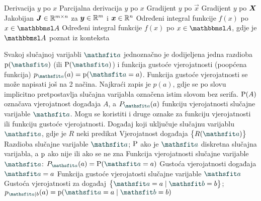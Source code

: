 				{Derivacija $y$ po $x$}
 				{Parcijalna derivacija $y$ po $x$}
 	{Gradijent $y$ po $\vec x$}
	{Gradijent $y$ po $\mat X$}
 	{Jakobijan $\mat J\in \R^{m\times n}$ za $\vec y\in\R^m$ i $\vec x\in\R^n$}
 {Određeni integral funkcije $f(x)$ po $x\in\set A$}
 {Određeni integral funkcije $f(x)$ po $x\in\set A$, gdje je $\set A$ poznat iz konteksta}

{Svakoj slučajnoj varijabli $\rvar a$ jednoznačno je dodijeljena jedna razdioba $\p(\rvar a)$ (ili $\P(\rvar a)$) i funkcija gustoće vjerojatnosti (poopćena funkcija) $p_{\rvar a}(a)=\p(\rvar a=a)$. Funkcija gustoće vjerojatnosti se može napisati još na 2 načina. Najkraći zapis je $p(a)$, gdje se po slovu implicitno pretpostavlja slučajna varijabla označena istim slovom bez serifa. $\P(A)$ označava vjerojatnost događaja $A$, a $P_{\rvar a}(a)$ funkciju vjerojatnosti slučajne varijable $\rvar a$. Mogu se koristiti i druge oznake za funkciju vjerojatnosti ili funkciju gustoće vjerojatnosti.}
 {Događaj koji uključuje slučajnu varijablu $\rvar a$, gdje je $R$ neki predikat}
 {Vjerojatnost događaja $\cbr{R(\rvar a)}$}
 {Razdioba slučajne varijable $\rvar a$; $\P$ ako je $\rvar a$ diskretna slučajna varijabla, a $\p$ ako nije ili ako se ne zna}
 {Funkcija vjerojatnosti slučajne varijable $\rvar a$: $P_{\rvar a}(a)=\P(\rvar a= a)$}
 {Gustoća vjerojatnosti događaja $\rvar a=a$}
 {Funkcija gustoće vjerojatosti slučajne varijable $\rvar a$}
 {Gustoća vjerojatnosti za događaj $\cbr{\rvar a= a\mid\rvar b= b}$; $p_{\rvar a\mid b}(a)=\p(\rvar a= a\mid\rvar b= b)$}
